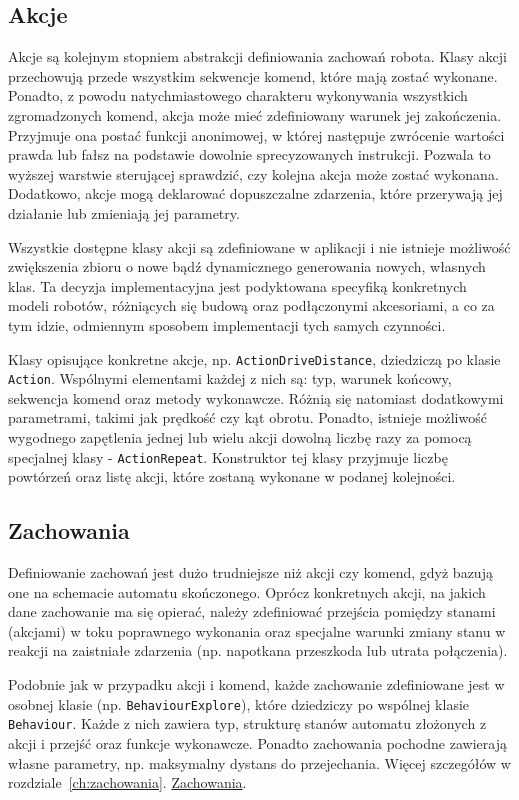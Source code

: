 \subsection{Akcje}
\indent \indent Akcje są kolejnym stopniem abstrakcji definiowania zachowań robota. Klasy akcji przechowują przede wszystkim sekwencje komend, które mają zostać wykonane. Ponadto, z powodu natychmiastowego charakteru wykonywania wszystkich zgromadzonych komend, akcja może mieć zdefiniowany warunek jej zakończenia. Przyjmuje ona postać funkcji anonimowej, w której następuje zwrócenie wartości prawda lub fałsz na podstawie dowolnie sprecyzowanych instrukcji. Pozwala to wyższej warstwie sterującej sprawdzić, czy kolejna akcja może zostać wykonana. Dodatkowo, akcje mogą deklarować dopuszczalne zdarzenia, które przerywają jej działanie lub zmieniają jej parametry.

Wszystkie dostępne klasy akcji są zdefiniowane w aplikacji i nie istnieje możliwość zwiększenia zbioru o nowe bądź dynamicznego generowania nowych, własnych klas. Ta decyzja implementacyjna jest podyktowana specyfiką konkretnych modeli robotów, różniących się budową oraz podłączonymi akcesoriami, a co za tym idzie, odmiennym sposobem implementacji tych samych czynności.

Klasy opisujące konkretne akcje, np. {\tt ActionDriveDistance}, dziedziczą po klasie {\tt Action}. Wspólnymi elementami każdej z nich są: typ, warunek końcowy, sekwencja komend oraz metody wykonawcze. Różnią się natomiast dodatkowymi parametrami, takimi jak prędkość czy kąt obrotu. Ponadto, istnieje możliwość wygodnego zapętlenia jednej lub wielu akcji dowolną liczbę razy za pomocą specjalnej klasy - {\tt ActionRepeat}. Konstruktor tej klasy przyjmuje liczbę powtórzeń oraz listę akcji, które zostaną wykonane w podanej kolejności.

\subsection{Zachowania}

\indent \indent Definiowanie zachowań jest dużo trudniejsze niż akcji czy komend, gdyż bazują one na schemacie automatu skończonego. Oprócz konkretnych akcji, na jakich dane zachowanie ma się opierać, należy zdefiniować przejścia pomiędzy stanami (akcjami) w toku poprawnego wykonania oraz specjalne warunki zmiany stanu w reakcji na zaistniałe zdarzenia (np. napotkana przeszkoda lub utrata połączenia).

Podobnie jak w przypadku akcji i komend, każde zachowanie zdefiniowane jest w osobnej klasie (np. {\tt BehaviourExplore}), które dziedziczy po wspólnej klasie {\tt Behaviour}. Każde z nich zawiera typ, strukturę stanów automatu złożonych z akcji i przejść oraz funkcje wykonawcze. Ponadto zachowania pochodne zawierają własne parametry, np. maksymalny dystans do przejechania. Więcej szczegółów w rozdziale~\ref{ch:zachowania}. \hyperref[ch:zachowania]{Zachowania}.

